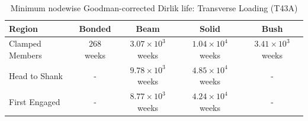\begin{table}[H]
    \centering
    \caption{Minimum nodewise Goodman-corrected Dirlik life: Transverse Loading (T43A)}
    \label{tab:MinLife_transverse_t43a_nodewise_weeks}
    \begin{tabular}{lcccc}
        \toprule
        Region & Bonded & Beam & Solid & Bush \\
        \midrule
        Clamped Members & $268$ weeks & $3.07\times10^{3}$ weeks & $1.04\times10^{4}$ weeks & $3.41\times10^{3}$ weeks \\
        Head to Shank & - & $9.78\times10^{3}$ weeks & $4.85\times10^{4}$ weeks & - \\
        First Engaged & - & $8.77\times10^{3}$ weeks & $4.24\times10^{4}$ weeks & - \\
        \bottomrule
    \end{tabular}
\end{table}
